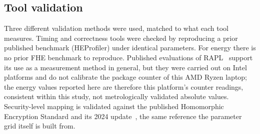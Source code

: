 \subsection{Tool validation}

Three different validation methods were used, matched to what each tool measures. Timing and correctness tools were checked by reproducing a prior published benchmark (HEProfiler) under identical parameters. For energy there is no prior FHE benchmark to reproduce. Published evaluations of RAPL~\cite{khan2018} support its use as a measurement method in general, but they were carried out on Intel platforms and do not calibrate the package counter of this AMD Ryzen laptop; the energy values reported here are therefore this platform's counter readings, consistent within this study, not metrologically validated absolute values. Security-level mapping is validated against the published Homomorphic Encryption Standard and its 2024 update~\cite{hestandard2021,bossuat2024}, the same reference the parameter grid itself is built from.
